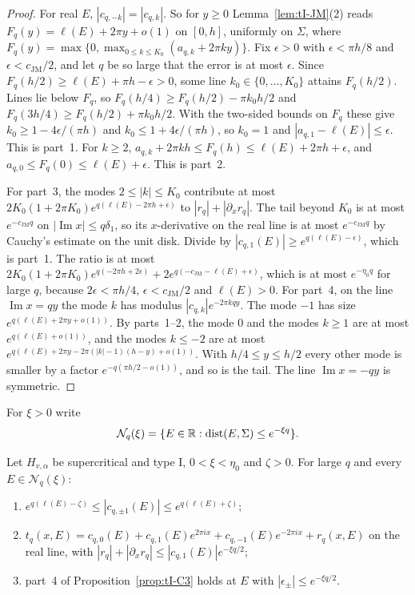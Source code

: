 \begin{proof}
For real $E$, $|c_{q,-k}|=|c_{q,k}|$. So for $y\ge0$ Lemma~\ref{lem:tI-JM}(2) reads $F_q(y)=\ell(E)+2\pi y+o(1)$ on $[0,h]$, uniformly on $\Sigma$, where $F_q(y)=\max\{0,\max_{0\le k\le K_0}(a_{q,k}+2\pi ky)\}$. Fix $\epsilon>0$ with $\epsilon<\pi h/8$ and $\epsilon<c_{\mathrm{JM}}/2$, and let $q$ be so large that the error is at most $\epsilon$. Since $F_q(h/2)\ge\ell(E)+\pi h-\epsilon>0$, some line $k_0\in\{0,\dots,K_0\}$ attains $F_q(h/2)$. Lines lie below $F_q$, so $F_q(h/4)\ge F_q(h/2)-\pi k_0h/2$ and $F_q(3h/4)\ge F_q(h/2)+\pi k_0h/2$. With the two-sided bounds on $F_q$ these give $k_0\ge1-4\epsilon/(\pi h)$ and $k_0\le1+4\epsilon/(\pi h)$, so $k_0=1$ and $|a_{q,1}-\ell(E)|\le\epsilon$. This is part~1. For $k\ge2$, $a_{q,k}+2\pi kh\le F_q(h)\le\ell(E)+2\pi h+\epsilon$, and $a_{q,0}\le F_q(0)\le\ell(E)+\epsilon$. This is part~2.

For part~3, the modes $2\le|k|\le K_0$ contribute at most $2K_0(1+2\pi K_0)e^{q(\ell(E)-2\pi h+\epsilon)}$ to $|r_q|+|\partial_xr_q|$. The tail beyond $K_0$ is at most $e^{-c_{\mathrm{JM}}q}$ on $|\operatorname{Im}x|\le q\delta_1$, so its $x$-derivative on the real line is at most $e^{-c_{\mathrm{JM}}q}$ by Cauchy's estimate on the unit disk. Divide by $|c_{q,1}(E)|\ge e^{q(\ell(E)-\epsilon)}$, which is part~1. The ratio is at most $2K_0(1+2\pi K_0)e^{q(-2\pi h+2\epsilon)}+2e^{q(-c_{\mathrm{JM}}-\ell(E)+\epsilon)}$, which is at most $e^{-\eta_0q}$ for large $q$, because $2\epsilon<\pi h/4$, $\epsilon<c_{\mathrm{JM}}/2$ and $\ell(E)>0$. For part~4, on the line $\operatorname{Im}x=qy$ the mode $k$ has modulus $|c_{q,k}|e^{-2\pi kqy}$. The mode $-1$ has size $e^{q(\ell(E)+2\pi y+o(1))}$. By parts~1--2, the mode $0$ and the modes $k\ge1$ are at most $e^{q(\ell(E)+o(1))}$, and the modes $k\le-2$ are at most $e^{q(\ell(E)+2\pi y-2\pi(|k|-1)(h-y)+o(1))}$. With $h/4\le y\le h/2$ every other mode is smaller by a factor $e^{-q(\pi h/2-o(1))}$, and so is the tail. The line $\operatorname{Im}x=-qy$ is symmetric.
\end{proof}

For $\xi>0$ write
\[
\mathcal N_q(\xi)=\{E\in\mathbb R:\operatorname{dist}(E,\Sigma)\le e^{-\xi q}\}.
\]

\begin{lemma}\label{lem:tI-near}
Let $H_{v,\alpha}$ be supercritical and type I, $0<\xi<\eta_0$ and $\zeta>0$. For large $q$ and every $E\in\mathcal N_q(\xi)$:
\begin{enumerate}
\item $e^{q(\ell(E)-\zeta)}\le|c_{q,\pm1}(E)|\le e^{q(\ell(E)+\zeta)}$;
\item $t_q(x,E)=c_{q,0}(E)+c_{q,1}(E)e^{2\pi ix}+c_{q,-1}(E)e^{-2\pi ix}+r_q(x,E)$ on the real line, with $|r_q|+|\partial_xr_q|\le|c_{q,1}(E)|e^{-\xi q/2}$;
\item part~4 of Proposition~\ref{prop:tI-C3} holds at $E$ with $|\epsilon_\pm|\le e^{-\xi q/2}$.
\end{enumerate}
\end{lemma}

